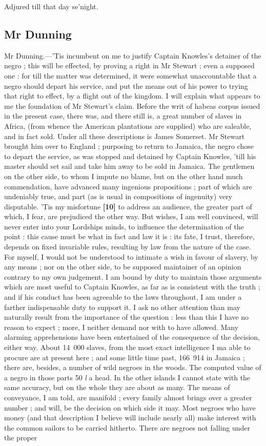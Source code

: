 \documentclass[a4paper]{article}
\begin{document}
Adjured till that day se'night.

\subsection{Mr Dunning}
Mr Dunning.---'Tis incumbent on me to justify Captain Knowles's detainer of the negro ; this will be effected, by proving a right in Mr Stewart ; even a supposed one : for till the matter was determined, it were somewhat unaccountable that a negro should depart his service, and put the means out of his power to trying that right to effect, by a flight out of the kingdom. I will explain what appears to me the foundation of Mr Stewart's claim. Before the writ of habeas corpus issued in the present case, there was, and there still is, a great number of slaves in Africa, (from whence the American plantations are supplied) who are saleable, and in fact sold. Under all these descriptions is James Somerset. Mr Stewart brought him over to England ; purposing to return to Jamaica, the negro chose to depart the service, as was stopped and detained by Captain Knowles, 'till his master should set sail and take him away to be sold in Jamaica. The gentlemen on the other side, to whom I impute no blame, but on the other hand much commendation, have advanced many ingenious propositions ; part of which are undeniably true, and part (as is usual in compositions of ingenuity) very disputable. 'Tis my misfortune \textbf{[10]} to address an audience, the greater part of which, I fear, are prejudiced the other way. But wishes, I am well convinced, will never enter into your Lordships minds, to influence the determination of the point : this cause must be what in fact and law it is : its fate, I trust, therefore, depends on fixed invariable rules, resulting by law from the nature of the case. For myself, I would not be understood to intimate a wish in favour of slavery, by any means ; nor on the other side, to be supposed maintainer of an opinion contrary to my own judgement. I am bound by duty to maintain those arguments which are most useful to Captain Knowles, as far as is consistent with the truth ; and if his conduct has been agreeable to the laws throughout, I am under a farther indispensable duty to support it. I ask no other attention than may naturally result from the importance of the question : less than this I have no reason to expect ; more, I neither demand nor with to have allowed. Many alarming apprehensions have been entertained of the consequence of the decision, either way. About 14~000 slaves, from the most exact intelligence I ma able to procure are at present here ; and some little time past,  166~914 in Jamaica ; there are, besides, a number of wild negroes in the woods. The computed value of a negro in those parts 50 \emph{l} a head. In the other islands I cannot state with the same accuracy, but on the whole they are about as many. The means of conveyance, I am told, are manifold ; every family almost brings over a greater number ; and will, be the decision on which side it may. Most negroes who have money (and that description I believe will include nearly all) make interest with the common sailors to be carried hitherto. There are negroes not falling under the proper 
\end{document}
